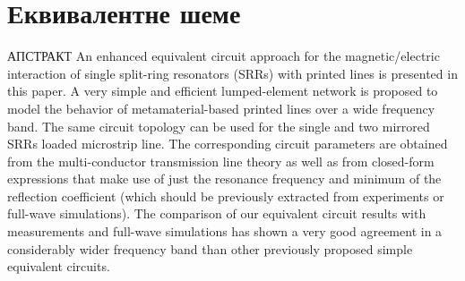 \newcommand{\SirA}{2.0cm}
\newcommand{\SirB}{0.8\textwidth}

\newcommand{\specialcell}[2][c]{%
  \begin{tabular}[#1]{@{}c@{}c@{}}#2\end{tabular}}

\newcommand{\Fig}[1]{сл.~$\!${\ref{#1}}} 
\newcommand{\Sec}[1]{Sec.~$\!${\ref{#1}}} 
\newcommand{\blue}[1]{\textcolor{blue}{#1}}
\newcommand{\red}[1]{\textcolor{red}{#1}}
\newcommand{\comment}[1]{}




\chapter{Еквивалентне шеме}

АПСТРАКТ
An enhanced equivalent circuit approach for the magnetic/electric interaction of single
split-ring resonators (SRRs) with printed lines is presented in this paper. A very simple and
efficient lumped-element network is proposed to model the behavior of metamaterial-based
printed lines over a wide frequency band. The same circuit topology can be used for the single
and two mirrored SRRs loaded microstrip line. The corresponding circuit parameters are obtained
from the multi-conductor transmission line theory as well as from closed-form expressions that
make use of just the resonance frequency and minimum of the reflection coefficient (which
should be previously extracted from experiments or full-wave simulations). The comparison of
our equivalent circuit results with measurements and full-wave simulations has shown a very
good agreement in a considerably wider frequency band than other previously proposed simple
equivalent circuits. 

